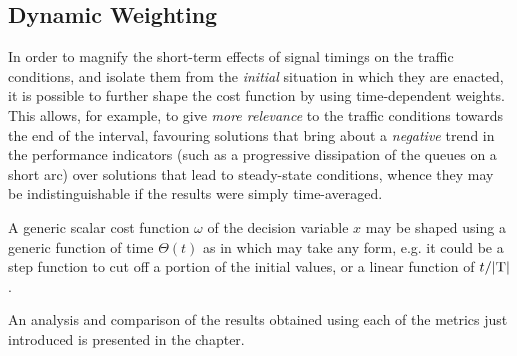 \subsection{Dynamic Weighting}
In order to magnify the short-term effects of signal timings on the traffic conditions, and isolate them from the \emph{initial} situation in which they are enacted, it is possible to further shape the cost function by using time-dependent weights. This allows, for example, to give \emph{more relevance} to the traffic conditions towards the end of the interval, favouring solutions that bring about a \emph{negative} trend in the performance indicators (such as a progressive dissipation of the queues on a short arc) over solutions that lead to steady-state conditions, whence they may be indistinguishable if the results were simply time-averaged.

A generic scalar cost function $\omega$ of the decision variable $x$
may be shaped using a generic function of time $\Theta(t)$ as in
which may take any form, e.g. it could be a step function to cut off a portion of the initial values, or a linear function of ${t}/{|\mathrm{T}|}$.

An analysis and comparison of the results obtained using each of the metrics just introduced is presented in the  chapter.